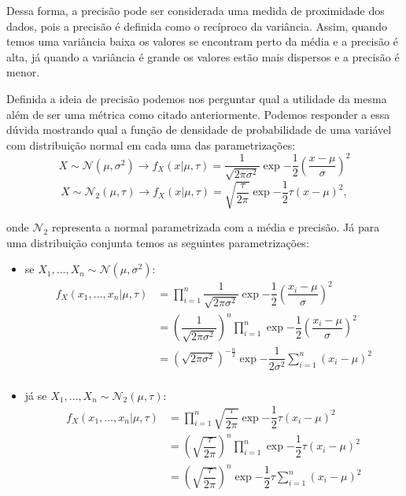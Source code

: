 \documentclass{article}
\begin{document}
	Dessa forma, a precisão pode ser considerada uma medida de proximidade dos dados, pois a precisão é definida como o recíproco da variância. Assim, quando temos uma variância baixa os valores se encontram perto da média e a precisão é alta, já quando a variância é grande os valores estão mais dispersos e a precisão é menor.
	
	Definida a ideia de precisão podemos nos perguntar qual a utilidade da mesma além de ser uma métrica como citado anteriormente. Podemos responder a essa dúvida mostrando qual a função de densidade de probabilidade de uma variável com distribuição normal em cada uma das parametrizações:
	\[X \sim \mathcal{N}(\mu, \sigma^2) \longrightarrow f_X(x | \mu, \tau) = \dfrac{1}{\sqrt{2\pi \sigma^2}}\exp{-\dfrac{1}{2}\left(\dfrac{x - \mu}{\sigma}\right)^2}\]
	\[X \sim \mathcal{N}_2(\mu, \tau) \longrightarrow f_X(x | \mu, \tau) = \sqrt{\dfrac{\tau}{2\pi}}\exp{-\dfrac{1}{2}\tau(x - \mu)^2},\]
	
	onde $\mathcal{N}_2$ representa a normal parametrizada com a média e precisão. Já para uma distribuição conjunta temos as seguintes parametrizações:
	\begin{itemize}
		\item
		se $X_1, \dots, X_n \sim \mathcal{N}(\mu, \sigma^2)$:
		\begin{equation*}
			\begin{split}
				f_X(x_1, \dots, x_n | \mu, \tau) & = \prod_{i = 1}^{n} \dfrac{1}{\sqrt{2\pi \sigma^2}}\exp{-\dfrac{1}{2}\left(\dfrac{x_i - \mu}{\sigma}\right)^2} \\
				& = \left(\dfrac{1}{\sqrt{2\pi \sigma^2}}\right)^n \prod_{i = 1}^{n} \exp{-\dfrac{1}{2}\left(\dfrac{x_i - \mu}{\sigma}\right)^2} \\
				& = \left(\sqrt{2\pi \sigma^2}\right)^{-\frac{n}{2}} \exp{-\dfrac{1}{2\sigma^2}\sum_{i = 1}^{n}\left(x_i - \mu\right)^2} \\
			\end{split}
		\end{equation*}
		
		\item
		já se $X_1, \dots, X_n \sim \mathcal{N}_2(\mu, \tau)$:
		\begin{equation}
			\label{eq1}
			\begin{split}
				f_X(x_1, \dots, x_n | \mu, \tau) & = \prod_{i = 1}^{n} \sqrt{\dfrac{\tau}{2\pi}}\exp{-\dfrac{1}{2}\tau(x_i - \mu)^2} \\
				& = \left(\sqrt{\dfrac{\tau}{2\pi}}\right)^n \prod_{i = 1}^{n} \exp{-\dfrac{1}{2}\tau\left(x_i - \mu\right)^2} \\
				& = \left(\sqrt{\dfrac{\tau}{2\pi}}\right)^n \exp{-\dfrac{1}{2}\tau\sum_{i = 1}^{n}\left(x_i - \mu\right)^2} \\
			\end{split}
		\end{equation}
	\end{itemize}
	
\end{document}
